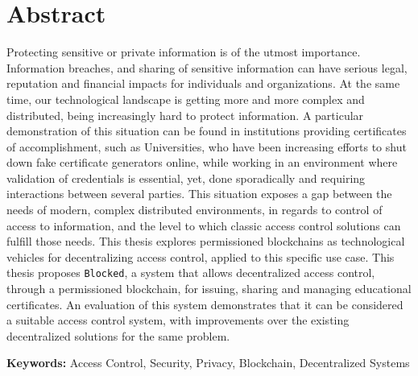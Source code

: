 \section*{Abstract}

Protecting sensitive or private information is of the utmost importance. Information breaches, and sharing of sensitive information can have serious legal, reputation and financial impacts for individuals and organizations. At the same time, our technological landscape is getting more and more complex and distributed, being increasingly hard to protect information. A particular demonstration of this situation can be found in institutions providing certificates of accomplishment, such as Universities, who have been increasing efforts to shut down fake certificate generators online, while working in an environment where validation of credentials is essential, yet, done sporadically and requiring interactions between several parties. This situation exposes a gap between the needs of modern, complex distributed environments, in regards to control of access to information, and the level to which classic access control solutions can fulfill those needs. This thesis explores permissioned blockchains as technological vehicles for decentralizing access control, applied to this specific use case. This thesis proposes \texttt{Blocked}, a system that allows decentralized access control, through a permissioned blockchain, for issuing, sharing and managing educational certificates. An evaluation of this system demonstrates that it can be considered a suitable access control system, with improvements over the existing decentralized solutions for the same problem.

\vfill

\noindent \textbf{Keywords:} Access Control, Security, Privacy, Blockchain, Decentralized Systems
